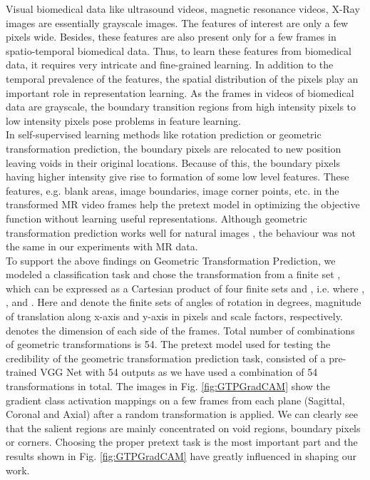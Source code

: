 \documentclass[journal]{IEEEtai}
\begin{document}
\indent Visual biomedical data like ultrasound videos, magnetic resonance videos, X-Ray images are essentially grayscale images. The features of interest are only a few pixels wide. Besides, these features are also present only for a few frames in spatio-temporal biomedical data. Thus, to learn these features from biomedical data, it requires very intricate and fine-grained learning. In addition to the temporal prevalence of the features, the spatial distribution of the pixels play an important role in representation learning. As the frames in videos of biomedical data are grayscale, the boundary transition regions from high intensity pixels to low intensity pixels pose problems in feature learning.\\
\indent In self-supervised learning methods like rotation prediction or geometric transformation prediction, the boundary pixels are relocated to new position leaving voids in their original locations. Because of this, the boundary pixels having higher intensity give rise to formation of some low level features. These features, e.g. blank areas, image boundaries, image corner points, etc. in the transformed MR video frames help the pretext model in optimizing the objective function without learning useful representations. Although geometric transformation prediction works well for natural images \cite{rotnet,videorotnet}, the behaviour was not the same in our experiments with MR data.\\
\indent To support the above findings on Geometric Transformation Prediction, we modeled a classification task and chose the transformation from a finite set , which can be expressed as a Cartesian product of four finite sets  and , i.e.  where , ,  and . Here  and  denote the finite sets of angles of rotation in degrees, magnitude of translation along x-axis and y-axis in pixels and scale factors, respectively.  denotes the dimension of each side of the frames. Total number of combinations of geometric transformations is 54. The pretext model used for testing the credibility of the geometric transformation prediction task, consisted of a pre-trained VGG Net with 54 outputs as we have used a combination of 54 transformations in total. The images in Fig. \ref{fig:GTPGradCAM} show the gradient class activation mappings \cite{gradcam} on a few frames from each plane (Sagittal, Coronal and Axial) after a random transformation is applied. We can clearly see that the salient regions are mainly concentrated on void regions, boundary pixels or corners. Choosing the proper pretext task is the most important part and the results shown in Fig. \ref{fig:GTPGradCAM} have greatly influenced in shaping our work.
\end{document}
